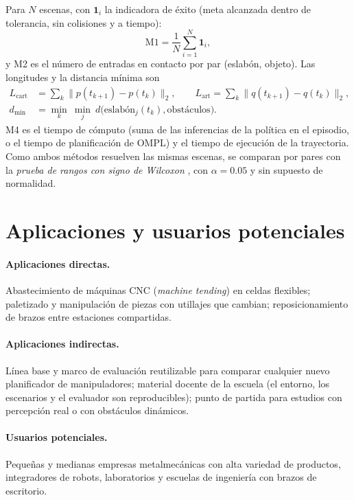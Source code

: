 \documentclass[11pt,a4paper,twoside]{article}
\newcommand{\ind}{\mathbf{1}}
\begin{document}
Para $N$ escenas, con $\ind_i$ la indicadora de éxito (meta alcanzada dentro de tolerancia, sin colisiones y a tiempo):
\begin{equation}
\text{M1}=\frac1N\sum_{i=1}^{N}\ind_i,
\end{equation}
y M2 es el número de entradas en contacto por par (eslabón, objeto). Las longitudes y la distancia mínima son
\begin{align}
L_{\mathrm{cart}}&=\sum_{k}\lVert p(t_{k+1})-p(t_k)\rVert_2,\qquad
L_{\mathrm{art}}=\sum_{k}\lVert q(t_{k+1})-q(t_k)\rVert_2,\\
d_{\min}&=\min_{k}\ \min_{j}\ d\bigl(\text{eslabón}_j(t_k),\text{obstáculos}\bigr).
\end{align}
M4 es el tiempo de cómputo (suma de las inferencias de la política en el episodio, o el tiempo de planificación de OMPL) y el tiempo de ejecución de la trayectoria. Como ambos métodos resuelven las mismas escenas, se comparan por pares con la \emph{prueba de rangos con signo de Wilcoxon} \cite{wilcoxon1945}, con $\alpha=0.05$ y sin supuesto de normalidad.

\section{Aplicaciones y usuarios potenciales}

\paragraph{Aplicaciones directas.} Abastecimiento de máquinas CNC (\emph{machine tending}) en celdas flexibles; paletizado y manipulación de piezas con utillajes que cambian; reposicionamiento de brazos entre estaciones compartidas.

\paragraph{Aplicaciones indirectas.} Línea base y marco de evaluación reutilizable para comparar cualquier nuevo planificador de manipuladores; material docente de la escuela (el entorno, los escenarios y el evaluador son reproducibles); punto de partida para estudios con percepción real o con obstáculos dinámicos.

\paragraph{Usuarios potenciales.} Pequeñas y medianas empresas metalmecánicas con alta variedad de productos, integradores de robots, laboratorios y escuelas de ingeniería con brazos de escritorio.
\end{document}
